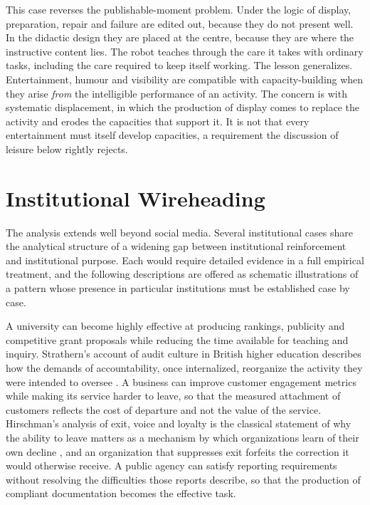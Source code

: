 \documentclass[11pt]{article}
\theoremstyle{definition}
\theoremstyle{remark}
\begin{document}
This case reverses the publishable-moment problem. Under the logic of display, preparation, repair and failure are edited out, because they do not present well. In the didactic design they are placed at the centre, because they are where the instructive content lies. The robot teaches through the care it takes with ordinary tasks, including the care required to keep itself working. The lesson generalizes. Entertainment, humour and visibility are compatible with capacity-building when they arise \emph{from} the intelligible performance of an activity. The concern is with systematic displacement, in which the production of display comes to replace the activity and erodes the capacities that support it. It is not that every entertainment must itself develop capacities, a requirement the discussion of leisure below rightly rejects.

\section{Institutional Wireheading}

The analysis extends well beyond social media. Several institutional cases share the analytical structure of a widening gap between institutional reinforcement and institutional purpose. Each would require detailed evidence in a full empirical treatment, and the following descriptions are offered as schematic illustrations of a pattern whose presence in particular institutions must be established case by case.

A university can become highly effective at producing rankings, publicity and competitive grant proposals while reducing the time available for teaching and inquiry. Strathern's account of audit culture in British higher education describes how the demands of accountability, once internalized, reorganize the activity they were intended to oversee \cite{strathern1997}. A business can improve customer engagement metrics while making its service harder to leave, so that the measured attachment of customers reflects the cost of departure and not the value of the service. Hirschman's analysis of exit, voice and loyalty is the classical statement of why the ability to leave matters as a mechanism by which organizations learn of their own decline \cite{hirschman1970}, and an organization that suppresses exit forfeits the correction it would otherwise receive. A public agency can satisfy reporting requirements without resolving the difficulties those reports describe, so that the production of compliant documentation becomes the effective task.
\end{document}
